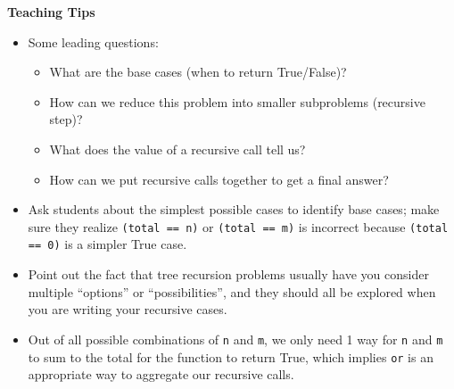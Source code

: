     \begin{guide}
    \begin{blocksection}
    \textbf{Teaching Tips}
    \begin{itemize}
        \item Some leading questions:
        \begin{itemize}
            \item What are the base cases (when to return True/False)?
            \item How can we reduce this problem into smaller subproblems (recursive step)?
            \item What does the value of a recursive call tell us?
            \item How can we put recursive calls together to get a final answer?
        \end{itemize}
        \item Ask students about the simplest possible cases to identify base cases; make sure they realize \lstinline{(total == n)} or \lstinline{(total == m)}  is incorrect because \lstinline{(total == 0)} is a simpler True case.
        \item Point out the fact that tree recursion problems usually have you consider multiple ``options'' or ``possibilities'', and they should all be explored when you are writing your recursive cases.
        \item Out of all possible combinations of \lstinline{n} and \lstinline{m}, we only need 1 way for \lstinline{n} and \lstinline{m} to sum to the total for the function to return True, which implies \lstinline{or} is an appropriate way to aggregate our recursive calls.
    \end{itemize}
    \end{blocksection}
    \end{guide}
    